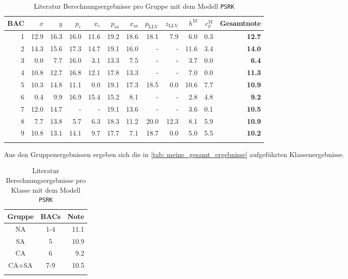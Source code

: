 \documentclass[../thesis.tex]{subfiles}
\begin{document}
\begin{table} [htb]
	\centering
	\caption{Literatur Berechnungsergebnisse pro Gruppe mit dem Modell \texttt{PSRK}}
	\begin{tabular}{ rrrrrrrrrrrr }
		\hline
		BAC & $ x $ & $ y $ & $ p_\mathrm{c}$ & $ x_\mathrm{c}$ & $ p_\mathrm{az}$ & $ x_\mathrm{az}$ & $ p_\mathrm{LLV}$ & $ z_\mathrm{LLV}$ & $ h^\mathrm{M} $ & $ c_p^\mathrm{M} $ & \textbf{Gesamtnote} \\
		\hline
		1 & 12.9 & 16.3 & 16.0  & 11.6  & 19.2  & 18.6 & 18.1 & 7.9  & 6.0  & 0.3 & \textbf{12.7}\\
		2 & 14.3 & 15.6 & 17.3  & 14.7  & 19.1  & 16.0 & -    & -    & 11.6 & 3.4 & \textbf{14.0}\\
		3 & 0.0  & 7.7  & 16.0  & 3.1   & 13.3  & 7.5  & -    & -    & 3.7  & 0.0 & \textbf{6.4}\\
		4 & 10.8 & 12.7 & 16.8  & 12.1  & 17.8  & 13.3 & -    & -    & 7.0  & 0.0 & \textbf{11.3}\\
		5 & 10.3 & 14.8 & 11.1  & 0.0   & 19.1  & 17.3 & 18.5 & 0.0  & 10.6 & 7.7 & \textbf{10.9}\\
		6 & 0.4  & 9.9  & 16.9  & 15.4  & 15.2  & 8.1  & -    & -    & 2.8  & 4.8 & \textbf{9.2}\\
		7 & 12.0 & 14.7 & -     & -     & 19.1  & 13.6 & -    & -    & 3.6  & 0.1 & \textbf{10.5}\\
		8 & 7.7  & 13.8 & 5.7   & 6.3   & 18.3  & 11.2 & 20.0 & 12.3 & 8.1  & 5.9 & \textbf{10.9}\\
		9 & 10.8 & 13.1 & 14.1  & 9.7   & 17.7  & 7.1  & 18.7 & 0.0  & 5.0  & 5.5 & \textbf{10.2}\\
		\hline
		\label{tab: PSRK benchmark literatur bac}
	\end{tabular}
\end{table}

Aus den Gruppenergebnissen ergeben sich die in \autoref{tab: meine_gesamt_ergebnisse} aufgeführten Klassenergebnisse.

\begin{table} [htb]
	\centering
	\caption{Literatur Berechnungsergebnisse pro Klasse mit dem Modell \texttt{PSRK}}
	\begin{tabular}{ ccr }
		\hline
		Gruppe & BACs & Note  \\
		\hline
		NA & 1-4 & 11.1 \\
		SA & 5   & 10.9 \\
		CA & 6   & 9.2 \\
		CA+SA & 7-9 & 10.5 \\ 
		\hline
		\label{tab: PSRK benchmark literatur gruppen}
	\end{tabular}
\end{table}
\end{document}
